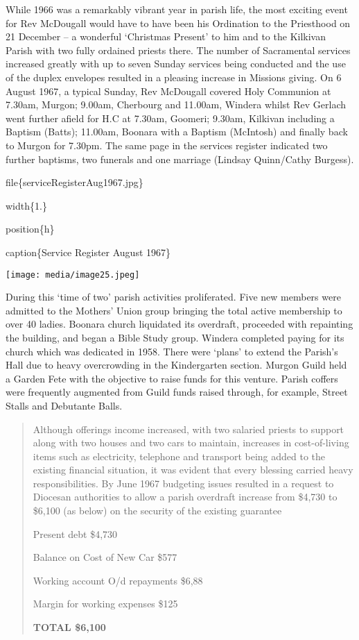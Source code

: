 While 1966 was a remarkably vibrant year in parish life, the most
exciting event for Rev McDougall would have to have been his Ordination
to the Priesthood on 21 December -- a wonderful `Christmas Present' to
him and to the Kilkivan Parish with two fully ordained priests there.
The number of Sacramental services increased greatly with up to seven
Sunday services being conducted and the use of the duplex envelopes
resulted in a pleasing increase in Missions giving. On 6 August 1967, a
typical Sunday, Rev McDougall covered Holy Communion at 7.30am, Murgon;
9.00am, Cherbourg and 11.00am, Windera whilst Rev Gerlach went further
afield for H.C at 7.30am, Goomeri; 9.30am, Kilkivan including a Baptism
(Batts); 11.00am, Boonara with a Baptism (McIntosh) and finally back to
Murgon for 7.30pm. The same page in the services register indicated two
further baptisms, two funerals and one marriage (Lindsay Quinn/Cathy
Burgess).

file\{serviceRegisterAug1967.jpg\}

width\{1.\}

position\{h\}

caption\{Service Register August 1967\}

\texttt{[image: media/image25.jpeg]}

During this `time of two' parish activities proliferated. Five new
members were admitted to the Mothers' Union group bringing the total
active membership to over 40 ladies. Boonara church liquidated its
overdraft, proceeded with repainting the building, and began a Bible
Study group. Windera completed paying for its church which was dedicated
in 1958. There were `plans' to extend the Parish's Hall due to heavy
overcrowding in the Kindergarten section. Murgon Guild held a Garden
Fete with the objective to raise funds for this venture. Parish coffers
were frequently augmented from Guild funds raised through, for example,
Street Stalls and Debutante Balls.

\begin{quote}
Although offerings income increased, with two salaried priests to
support along with two houses and two cars to maintain, increases in
cost-of-living items such as electricity, telephone and transport being
added to the existing financial situation, it was evident that every
blessing carried heavy responsibilities. By June 1967 budgeting issues
resulted in a request to Diocesan authorities to allow a parish
overdraft increase from \$4,730 to \$6,100 (as below) on the security of
the existing guarantee

Present debt \$4,730

Balance on Cost of New Car \$577

Working account O/d repayments \$6,88

Margin for working expenses \$125

\textbf{TOTAL \$6,100}
\end{quote}

